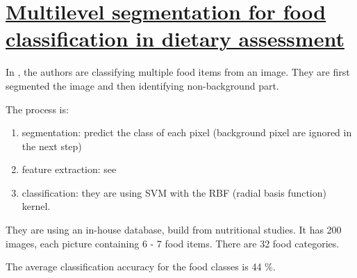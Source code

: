 \section{\href{http://ieeexplore.ieee.org/xpls/abs_all.jsp?arnumber=6046629}{Multilevel segmentation for food classification in dietary assessment}}

In \cite{Zhu2011}, the authors are classifying multiple food items from an image. They are first segmented the image and then identifying non-background part.

The process is:
\begin{enumerate}
    \item segmentation: predict the class of each pixel (background pixel are ignored in the next step)
    \item feature extraction: see \cite{Bosch2011}
    \item classification: they are using SVM with the RBF (radial basis function) kernel.
\end{enumerate}

They are using an in-house database, build from nutritional studies. It has 200 images, each picture containing 6 - 7 food items. There are 32 food categories.

The average classification accuracy for the food classes is 44 \%.
